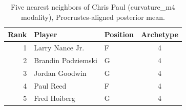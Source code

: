 \begin{table}[htbp]
  \centering\small
  \begin{tabular}{rllc}
    \toprule
    Rank & Player & Position & Archetype \\
    \midrule
    1 & Larry Nance Jr. & F & 4 \\
    2 & Brandin Podziemski & G & 4 \\
    3 & Jordan Goodwin & G & 4 \\
    4 & Paul Reed & F & 4 \\
    5 & Fred Hoiberg & G & 4 \\
    \bottomrule
  \end{tabular}
  \caption{Five nearest neighbors of Chris Paul (curvature_m4 modality), Procrustes-aligned posterior mean.}
  \label{tab:Chris_Paul_neighbors_curvature_m4}
\end{table}

